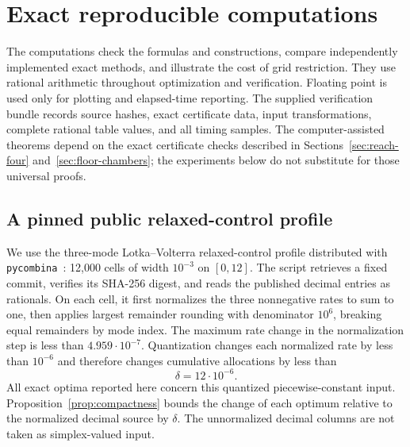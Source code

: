 \section{Exact reproducible computations}\label{sec:computations}

The computations check the formulas and constructions, compare independently
implemented exact methods, and illustrate the cost of grid restriction. They
use rational arithmetic throughout optimization and verification. Floating
point is used only for plotting and elapsed-time reporting. The supplied
verification bundle records source hashes, exact certificate data, input
transformations, complete rational table values, and all timing samples.
The computer-assisted theorems depend on the exact certificate checks described
in Sections~\ref{sec:reach-four} and~\ref{sec:floor-chambers}; the experiments
below do not substitute for those universal proofs.

\subsection{A pinned public relaxed-control profile}

We use the three-mode Lotka--Volterra relaxed-control profile distributed with
\texttt{pycombina}~\cite{pycombina-data}: 12,000 cells of width $10^{-3}$ on
$[0,12]$. The script retrieves a fixed commit, verifies its SHA-256 digest,
and reads the published decimal entries as rationals. On each cell, it first
normalizes the three nonnegative rates to sum to one, then applies largest
remainder rounding with denominator $10^6$, breaking equal remainders by mode
index. The maximum rate change in the normalization step is less than
$4.959\cdot10^{-7}$. Quantization changes each normalized rate by less than
$10^{-6}$ and therefore changes cumulative allocations by less than
\[
 \delta=12\cdot10^{-6}.
\]
All exact optima reported here concern this quantized piecewise-constant input.
Proposition~\ref{prop:compactness} bounds the change of each optimum relative
to the normalized decimal source by $\delta$. The unnormalized decimal
columns are not taken as simplex-valued input.

